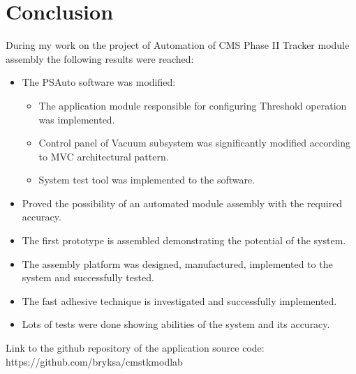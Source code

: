 \chapter{Conclusion}

During my work on the project of Automation of CMS Phase II Tracker module assembly the following results were reached:

\begin{itemize}
\setlength\itemsep{-0.5em}
\item The PSAuto software was modified:
\begin{itemize}
\setlength\itemsep{-0.5em}
\item The application module responsible for configuring Threshold operation was implemented.
\item Control panel of Vacuum subsystem was significantly modified according to MVC architectural pattern.
\item System test tool was implemented to the software.
\end{itemize}
\item Proved the possibility of an automated module assembly with the required accuracy.
\item The first prototype is assembled demonstrating the potential of the system.
\item The assembly platform was designed, manufactured, implemented to the system and successfully tested.
\item The fast adhesive technique is investigated and successfully implemented.
\item Lots of tests were done showing abilities of the system and its accuracy.

\end{itemize}

Link to the github repository of the application source code:
https://github.com/bryksa/cmstkmodlab



